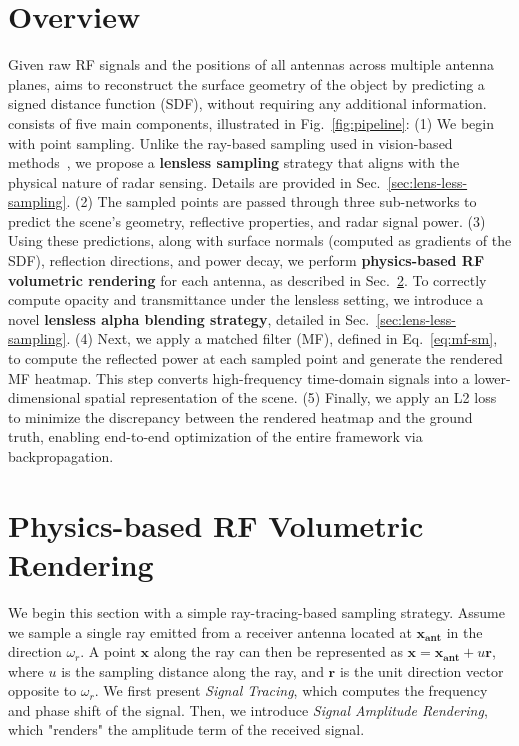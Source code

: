 

\section{Overview}
Given raw RF signals and the positions of all antennas across multiple antenna planes, \name{} aims to reconstruct the surface geometry of the object by predicting a signed distance function (SDF), without requiring any additional information.
\name{} consists of five main components, illustrated in Fig.~\ref{fig:pipeline}:
(1) We begin with point sampling. Unlike the ray-based sampling used in vision-based methods~\cite{mildenhall2021nerf}, we propose a {\bf lensless sampling} strategy that aligns with the physical nature of radar sensing.
Details are provided in Sec.~\ref{sec:lens-less-sampling}.
(2) The sampled points are passed through three sub-networks to predict the scene's geometry, reflective properties, and radar signal power.
(3) Using these predictions, along with surface normals (computed as gradients of the SDF), reflection directions, and power decay, we perform {\bf physics-based RF volumetric rendering} for each antenna, as described in Sec.~\ref{sec:volumetric_rendering}.
To correctly compute opacity and transmittance under the lensless setting, we introduce a novel {\bf lensless alpha blending strategy}, detailed in Sec.~\ref{sec:lens-less-sampling}.
(4) Next, we apply a matched filter (MF), defined in Eq.~\ref{eq:mf-sm}, to compute the reflected power at each sampled point and generate the rendered MF heatmap.
This step converts high-frequency time-domain signals into a lower-dimensional spatial representation of the scene.
(5) Finally, we apply an L2 loss to minimize the discrepancy between the rendered heatmap and the ground truth, enabling end-to-end optimization of the entire framework via backpropagation.


\section{Physics-based RF Volumetric Rendering}
\label{sec:volumetric_rendering}
We begin this section with a simple ray-tracing-based sampling strategy.
Assume we sample a single ray emitted from a receiver antenna located at $\mathbf{x_{ant}}$ in the direction $\omega_r$. A point $\mathbf{x}$ along the ray can then be represented as $\mathbf{x} = \mathbf{x_{ant}} + u\mathbf{r}$, where \( u \) is the sampling distance along the ray, and \( \mathbf{r} \) is the unit direction vector opposite to \( \omega_r \).
We first present \textit{Signal Tracing}, which computes the frequency and phase shift of the signal.
Then, we introduce \textit{Signal Amplitude Rendering}, which "renders" the amplitude term of the received signal.

